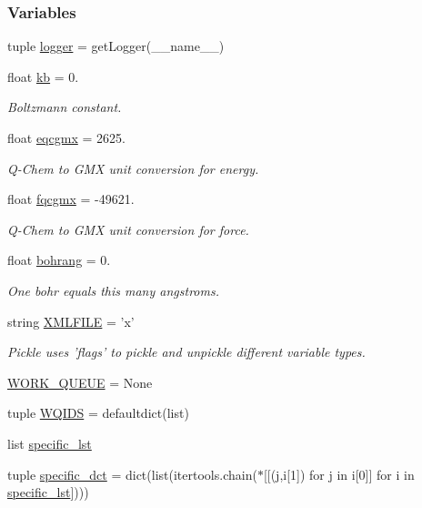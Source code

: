 \subsubsection*{Variables}
\begin{DoxyCompactItemize}
\item 
tuple \hyperlink{namespaceforcebalance_1_1nifty_a1859e992ed983dbbcc8093fdd19710e7}{logger} = get\-Logger(\-\_\-\-\_\-name\-\_\-\-\_\-)
\item 
float \hyperlink{namespaceforcebalance_1_1nifty_ae0916a3186f4f8b238a0d58bb9f6a3da}{kb} = 0.
\begin{DoxyCompactList}\small\item\em Boltzmann constant. \end{DoxyCompactList}\item 
float \hyperlink{namespaceforcebalance_1_1nifty_a7cec4d46378b888cd867de05d0168d96}{eqcgmx} = 2625.
\begin{DoxyCompactList}\small\item\em Q-\/\-Chem to G\-M\-X unit conversion for energy. \end{DoxyCompactList}\item 
float \hyperlink{namespaceforcebalance_1_1nifty_ab1ec21beaae0d8328e7e4c3b89d972ab}{fqcgmx} = -\/49621.
\begin{DoxyCompactList}\small\item\em Q-\/\-Chem to G\-M\-X unit conversion for force. \end{DoxyCompactList}\item 
float \hyperlink{namespaceforcebalance_1_1nifty_a31a8d4a4240a1325bd4fa10033b7eee0}{bohrang} = 0.
\begin{DoxyCompactList}\small\item\em One bohr equals this many angstroms. \end{DoxyCompactList}\item 
string \hyperlink{namespaceforcebalance_1_1nifty_a338d5080f95188c37271c306f64093d8}{X\-M\-L\-F\-I\-L\-E} = 'x'
\begin{DoxyCompactList}\small\item\em Pickle uses 'flags' to pickle and unpickle different variable types. \end{DoxyCompactList}\item 
\hyperlink{namespaceforcebalance_1_1nifty_ac743196ed04a3315e95bbaaaf60856b8}{W\-O\-R\-K\-\_\-\-Q\-U\-E\-U\-E} = None
\item 
tuple \hyperlink{namespaceforcebalance_1_1nifty_a58baa87808815c9c227721b594804def}{W\-Q\-I\-D\-S} = defaultdict(list)
\item 
list \hyperlink{namespaceforcebalance_1_1nifty_abe850bcdf26cec4a0cf913a54a7ddfaa}{specific\-\_\-lst}
\item 
tuple \hyperlink{namespaceforcebalance_1_1nifty_ab652c941890b0f378100433699c8d255}{specific\-\_\-dct} = dict(list(itertools.\-chain($\ast$\mbox{[}\mbox{[}(j,i\mbox{[}1\mbox{]}) for j in i\mbox{[}0\mbox{]}\mbox{]} for i in \hyperlink{namespaceforcebalance_1_1nifty_abe850bcdf26cec4a0cf913a54a7ddfaa}{specific\-\_\-lst}\mbox{]})))
\end{DoxyCompactItemize}


